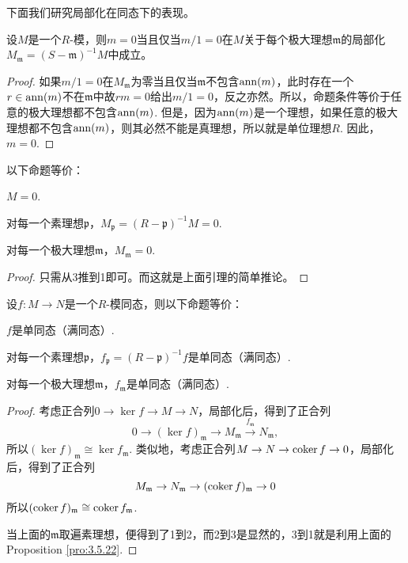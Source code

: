 下面我们研究局部化在同态下的表现。

\begin{lem}
设$M$是一个$R$-模，则$m=0$当且仅当$m/1=0$在$M$关于每个极大理想$\mathfrak m$的局部化$M_{\mathfrak m}=(S-\mathfrak m)^{-1}M$中成立。
\end{lem}

\begin{proof}
	如果$m/1=0$在$M_{\mathfrak m}$为零当且仅当$\mathfrak m$不包含$\ann(m)$，此时存在一个$r\in \ann(m)$不在$\mathfrak m$中故$rm=0$给出$m/1=0$，反之亦然。所以，命题条件等价于任意的极大理想都不包含$\ann(m)$. 但是，因为$\ann(m)$是一个理想，如果任意的极大理想都不包含$\ann(m)$，则其必然不能是真理想，所以就是单位理想$R$. 因此，$m=0$.
\end{proof}

\begin{pro}\label{pro:3.5.22}
以下命题等价：
\begin{compactenum}
	\item $M=0$.
	\item 对每一个素理想$\mathfrak{p}$，$M_{\mathfrak{p}}=(R-\mathfrak{p})^{-1}M=0$.
	\item 对每一个极大理想$\mathfrak{m}$，$M_{\mathfrak{m}}=0$.
\end{compactenum}
\end{pro}

\begin{proof}
	只需从3推到1即可。而这就是上面引理的简单推论。
\end{proof}

\begin{pro}
设$f:M\to N$是一个$R$-模同态，则以下命题等价：
\begin{compactenum}
	\item $f$是单同态（满同态）.
	\item 对每一个素理想$\mathfrak{p}$，$f_{\mathfrak{p}}=(R-\mathfrak{p})^{-1}f$是单同态（满同态）.
	\item 对每一个极大理想$\mathfrak{m}$，$f_{\mathfrak{m}}$是单同态（满同态）.
\end{compactenum}
\end{pro}

\begin{proof}
	考虑正合列$0\to \ker f\to M\to N$，局部化后，得到了正合列
	\[
		0\to (\ker f)_{\mathfrak m}\to M_{\mathfrak m}\xrightarrow{f_{\mathfrak m}} N_{\mathfrak m},
	\]
	所以$(\ker f)_{\mathfrak m}\cong \ker f_{\mathfrak m}$. 类似地，考虑正合列$M\to N\to \coker f\to 0$，局部化后，得到了正合列
	\[
		M_{\mathfrak m}\to N_{\mathfrak m}\to (\coker f)_{\mathfrak m}\to 0
	\]
	所以$(\coker f)_{\mathfrak m}\cong \coker f_{\mathfrak m}$.

	当上面的$\mathfrak m$取遍素理想，便得到了1到2，而2到3是显然的，3到1就是利用上面的Proposition \ref{pro:3.5.22}.
\end{proof}

